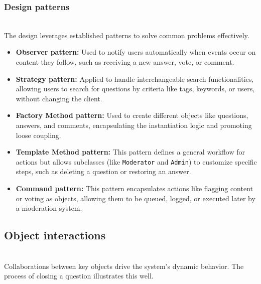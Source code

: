 \subsubsection{Design patterns}\label{EBQBSYq9umUMFUc1iXUkI}
\\
The design leverages established patterns to solve common problems effectively.

\begin{itemize}
\item
\protect{}\label{cs68x0Fm6vkrqkCd51AOT}
\textbf{Observer pattern:} Used to notify users automatically when events occur on content they follow, such as receiving a new answer, vote, or comment.
\item
\protect{}\label{j5o9p08Zl4S-4bObEYNUe}
\textbf{Strategy pattern:} Applied to handle interchangeable search functionalities, allowing users to search for questions by criteria like tags, keywords, or users, without changing the client.
\item
\protect{}\label{oY0RO68nzRmf8-kN_bgXK}
\textbf{Factory Method pattern:} Used to create different objects like questions, answers, and comments, encapsulating the instantiation logic and promoting loose coupling.
\item
\protect{}\label{Hxk0-NkH7PIf9l0DwPEBP}
\textbf{Template Method pattern:} This pattern defines a general workflow for actions but allows subclasses (like \texttt{Moderator} and \texttt{Admin}) to customize specific steps, such as deleting a question or restoring an answer.
\item
\protect{}\label{lAFY4GV7XFaF4uqS7Z-BX}
\textbf{Command pattern:} This pattern encapsulates actions like flagging content or voting as objects, allowing them to be queued, logged, or executed later by a moderation system.
\end{itemize}

\subsection{Object interactions}\label{ZytgHxbVvnyXZKGs9MUJx}
\\
Collaborations between key objects drive the system's dynamic behavior. The process of closing a question illustrates this well.

